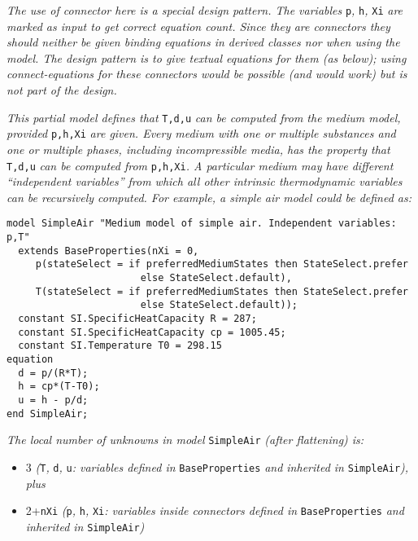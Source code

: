 \emph{The use of connector here is a special design pattern. The
variables} \lstinline!p!\emph{,} \lstinline!h!\emph{,} \lstinline!Xi! \emph{are marked as input to get
correct equation count. Since they are connectors they should neither be
given binding equations in derived classes nor when using the model. The
design pattern is to give textual equations for them (as below); using
connect-equations for these connectors would be possible (and would
work) but is not part of the design.}

\emph{This partial model defines that} \lstinline!T,d,u! \emph{can be computed from
the medium model, provided} \lstinline!p,h,Xi! \emph{are given. Every medium with
one or multiple substances and one or multiple phases, including
incompressible media, has the property that} \lstinline!T,d,u! \emph{can be computed
from} \lstinline!p,h,Xi!\emph{. A particular medium may have different ``independent
variables'' from which all other intrinsic thermodynamic variables can
be recursively computed. For example, a simple air model could be
defined as:}

\begin{lstlisting}[language=modelica]
model SimpleAir "Medium model of simple air. Independent variables: p,T"
  extends BaseProperties(nXi = 0,
     p(stateSelect = if preferredMediumStates then StateSelect.prefer
                       else StateSelect.default),
     T(stateSelect = if preferredMediumStates then StateSelect.prefer
                       else StateSelect.default));
  constant SI.SpecificHeatCapacity R = 287;
  constant SI.SpecificHeatCapacity cp = 1005.45;
  constant SI.Temperature T0 = 298.15
equation
  d = p/(R*T);
  h = cp*(T-T0);
  u = h - p/d;
end SimpleAir;
\end{lstlisting}

\emph{The local number of unknowns in model} \lstinline!SimpleAir! \emph{(after
flattening) is:}

\begin{itemize}
\item
  3 \emph{(}\lstinline!T!\emph{,} \lstinline!d!\emph{,} \lstinline!u!\emph{: variables defined in}
  \lstinline!BaseProperties! \emph{and inherited in} \lstinline!SimpleAir!\emph{), plus}
\item
  2+\lstinline!nXi! \emph{(}\lstinline!p!\emph{,} \lstinline!h!\emph{,}
	\lstinline!Xi!\emph{: variables inside
  connectors defined in} \lstinline!BaseProperties! \emph{and inherited in}
  \lstinline!SimpleAir!\emph{)}
\end{itemize}


